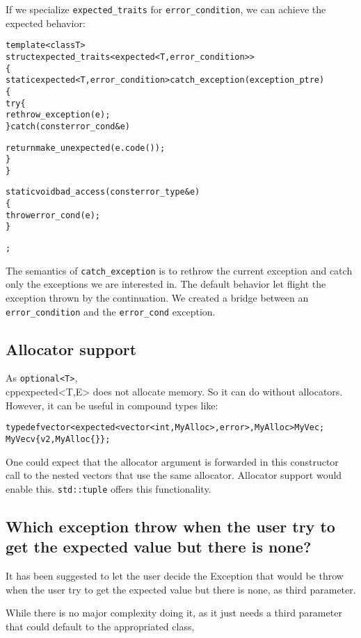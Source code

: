 \documentclass[a4paper,10pt]{article}
\newcommand{\cpp}[1]{\lstinline{#1}}
\begin{document}
\noindent
If we specialize \cpp{expected_traits} for \cpp{error_condition}, we can achieve the expected behavior:

\begin{alltt}
template <class T>
struct expected_traits<expected<T, error_condition>>
\{
  static expected<T, error_condition> catch_exception(exception_ptr e)
  \{
    try\{
      rethrow_exception(e);
    \} catch(const error_cond& e) {
      return make_unexpected(e.code());
    \}
  \}

  static void bad_access(const error_type &e)
  \{
    throw error_cond(e);
  \}
};
\end{alltt}

The semantics of \cpp{catch_exception} is to rethrow the current exception and catch only the exceptions we are interested in. The default behavior let flight the exception thrown by the continuation. We created a bridge between an \cpp{error_condition} and the \cpp{error_cond} exception.

\subsection{Allocator support}

As \cpp{optional<T>},  \\cpp{expected<T,E>} does not allocate memory. So it can do without allocators. However, it can be useful in compound types like:

\begin{alltt}
typedef vector<expected<vector<int, MyAlloc>, error>, MyAlloc> MyVec;
MyVec v\{ v2, MyAlloc\{\} \};
\end{alltt}

\noindent
One could expect that the allocator argument is forwarded in this constructor call to the nested vectors that use the same allocator. Allocator support would enable this. \cpp{std::tuple} offers this functionality.

\subsection{Which exception throw when the user try to get the expected value but there is none?}

It has been suggested to let the user decide the Exception that would be throw when the user try to get the expected value but there is none, as third parameter. 

While there is no major complexity doing it, as it just needs a third parameter that could default to the appropriated class, 
\end{document}
